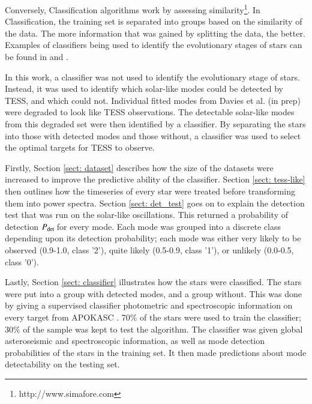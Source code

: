 \documentclass[a4paper,fleqn,usenatbib,useAMS]{mnras}
\newcommand{\pdet}{\ensuremath{P_{\rm det}\:}}
\begin{document}
Conversely, Classification algorithms work by assessing similarity\footnote{http://www.simafore.com}. In Classification, the training set is separated into groups based on the similarity of the data. The more information that was gained by splitting the data, the better. %
Examples of classifiers being used to identify the evolutionary stages of stars can be found in \citet{ness_cannon_2015} and \citet{wu_mass_2017}.

In this work, a classifier was not used to identify the evolutionary stage of stars. Instead, it was used to identify which solar-like modes could be detected by TESS, and which could not. Individual fitted modes from Davies et al. (in prep) were degraded to look like TESS observations. The detectable solar-like modes from this degraded set were then identified by a classifier. By separating the stars into those with detected modes and those without, a classifier was used to select the optimal targets for TESS to observe.

Firstly, Section \ref{sect: dataset} describes how the size of the datasets were increased to improve the predictive ability of the classifier. Section \ref{sect: tess-like} then outlines how the timeseries of every star were treated before transforming them into power spectra. Section \ref{sect: det_test} goes on to explain the detection test that was run on the solar-like oscillations. This returned a probability of detection \pdet for every mode. Each mode was grouped into a discrete class depending upon its detection probability; each mode was either very likely to be observed (0.9-1.0, class '2'), quite likely (0.5-0.9, class '1'), or unlikely (0.0-0.5, class '0').

Lastly, Section \ref{sect: classifier} illustrates how the stars were classified. The stars were put into a group with detected modes, and a group without. This was done by giving a supervised classifier photometric and spectroscopic information on every target from APOKASC \citep{pinsonneault_apokasc_2014}. 70\% of the stars were used to train the classifier; 30\% of the sample was kept to test the algorithm. The classifier was given global asteroseismic and spectroscopic information, as well as mode detection probabilities of the stars in the training set. It then made predictions about mode detectability on the testing set.
\end{document}
